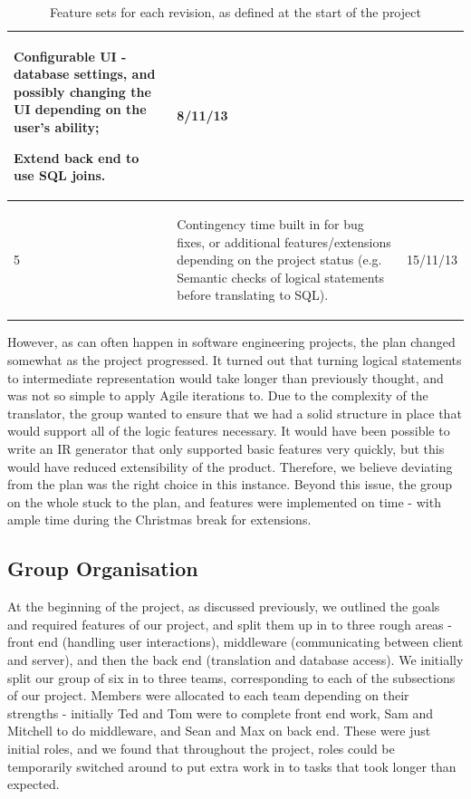 \documentclass[a4paper, 11pt]{article}
\begin{document}
\begin{table}[H]
\begin{tabular}{| l | p{} | l |}
\begin{compactitem}
            \item Configurable UI - database settings, and possibly changing the
              UI depending on the user's ability;
            \item Extend back end to use SQL joins.
          \end{compactitem}
          & 8/11/13 \\
        \hline
        5 &
          \begin{compactitem}
            \item Contingency time built in for bug fixes, or additional
              features/extensions depending on the project status (e.g. Semantic
              checks of logical statements before translating to SQL).
          \end{compactitem}
          & 15/11/13 \\
        \hline
      \end{tabular}
      \caption{Feature sets for each revision, as defined at the start of the
        project}
    \end{table}

    However, as can often happen in software engineering projects, the plan
    changed somewhat as the project progressed. It turned out that turning
    logical statements to intermediate representation would take longer than
    previously thought, and was not so simple to apply Agile iterations to. Due
    to the complexity of the translator, the group wanted to ensure that we
    had a solid structure in place that would support all of the logic features
    necessary. It would have been possible to write an IR generator that only
    supported basic features very quickly, but this would have reduced
    extensibility of the product. Therefore, we believe deviating from the plan
    was the right choice in this instance. Beyond this issue, the group on the
    whole stuck to the plan, and features were implemented on time - with ample
    time during the Christmas break for extensions.

  \subsection{Group Organisation}
    At the beginning of the project, as discussed previously, we outlined the
    goals and required features of our project, and split them up in to three
    rough areas - front end (handling user interactions),
    middleware (communicating between client and server), and
    then the back end (translation and database access).
    We initially split our group of six in to three teams,
    corresponding to each of the subsections of our project. Members were
    allocated to each team depending on their strengths - initially Ted and Tom
    were to complete front end work, Sam and Mitchell to do middleware, and
    Sean and Max on back end. These were just initial roles, and we found that
    throughout the project, roles could be temporarily switched around to put
    extra work in to tasks that took longer than expected.
\end{document}
